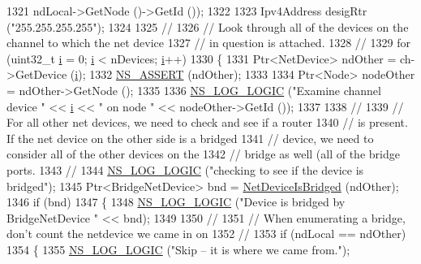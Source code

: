 \begin{DoxyCode}
1321                 ndLocal->GetNode ()->GetId ());
1322 
1323   Ipv4Address desigRtr (\textcolor{stringliteral}{"255.255.255.255"});
1324 
1325   \textcolor{comment}{//}
1326   \textcolor{comment}{// Look through all of the devices on the channel to which the net device}
1327   \textcolor{comment}{// in question is attached.}
1328   \textcolor{comment}{//}
1329   \textcolor{keywordflow}{for} (uint32\_t \hyperlink{bernuolliDistribution_8m_a6f6ccfcf58b31cb6412107d9d5281426}{i} = 0; \hyperlink{bernuolliDistribution_8m_a6f6ccfcf58b31cb6412107d9d5281426}{i} < nDevices; \hyperlink{bernuolliDistribution_8m_a6f6ccfcf58b31cb6412107d9d5281426}{i}++)
1330     \{
1331       Ptr<NetDevice> ndOther = ch->GetDevice (\hyperlink{bernuolliDistribution_8m_a6f6ccfcf58b31cb6412107d9d5281426}{i});
1332       \hyperlink{assert_8h_a6dccdb0de9b252f60088ce281c49d052}{NS\_ASSERT} (ndOther);
1333 
1334       Ptr<Node> nodeOther = ndOther->GetNode ();
1335 
1336       \hyperlink{group__logging_ga88acd260151caf2db9c0fc84997f45ce}{NS\_LOG\_LOGIC} (\textcolor{stringliteral}{"Examine channel device "} << \hyperlink{bernuolliDistribution_8m_a6f6ccfcf58b31cb6412107d9d5281426}{i} << \textcolor{stringliteral}{" on node "} << nodeOther->GetId ());
1337 
1338       \textcolor{comment}{//}
1339       \textcolor{comment}{// For all other net devices, we need to check and see if a router}
1340       \textcolor{comment}{// is present.  If the net device on the other side is a bridged}
1341       \textcolor{comment}{// device, we need to consider all of the other devices on the }
1342       \textcolor{comment}{// bridge as well (all of the bridge ports.}
1343       \textcolor{comment}{//}
1344       \hyperlink{group__logging_ga88acd260151caf2db9c0fc84997f45ce}{NS\_LOG\_LOGIC} (\textcolor{stringliteral}{"checking to see if the device is bridged"});
1345       Ptr<BridgeNetDevice> bnd = \hyperlink{classns3_1_1GlobalRouter_ad330b65439cd1be39799b52df948f98b}{NetDeviceIsBridged} (ndOther);
1346       \textcolor{keywordflow}{if} (bnd)
1347         \{
1348           \hyperlink{group__logging_ga88acd260151caf2db9c0fc84997f45ce}{NS\_LOG\_LOGIC} (\textcolor{stringliteral}{"Device is bridged by BridgeNetDevice "} << bnd);
1349 
1350           \textcolor{comment}{//}
1351           \textcolor{comment}{// When enumerating a bridge, don't count the netdevice we came in on}
1352           \textcolor{comment}{//}
1353           \textcolor{keywordflow}{if} (ndLocal == ndOther)
1354             \{
1355               \hyperlink{group__logging_ga88acd260151caf2db9c0fc84997f45ce}{NS\_LOG\_LOGIC} (\textcolor{stringliteral}{"Skip -- it is where we came from."});

\end{DoxyCode}
